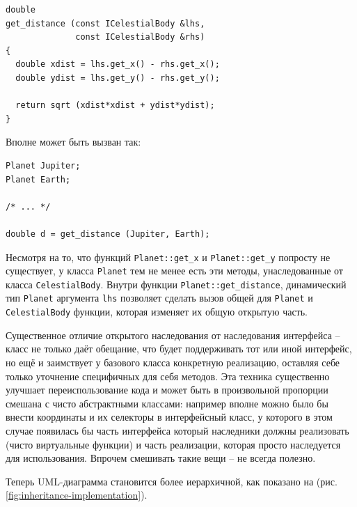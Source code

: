 \documentclass[a4paper,12pt,oneside]{article}
\begin{document}
\begin{lstlisting}
double 
get_distance (const ICelestialBody &lhs, 
              const ICelestialBody &rhs)
{
  double xdist = lhs.get_x() - rhs.get_x();
  double ydist = lhs.get_y() - rhs.get_y();

  return sqrt (xdist*xdist + ydist*ydist);
}
\end{lstlisting}

Вполне может быть вызван так:

\begin{lstlisting}
Planet Jupiter;
Planet Earth;

/* ... */

double d = get_distance (Jupiter, Earth);
\end{lstlisting}

Несмотря на то, что функций \lstinline!Planet::get_x! и \lstinline!Planet::get_y! попросту не существует, у класса \lstinline!Planet! тем не менее есть эти методы, унаследованные от класса \lstinline!CelestialBody!. Внутри функции \lstinline!Planet::get_distance!, динамический тип \lstinline!Planet! аргумента \lstinline!lhs! позволяет сделать вызов общей для \lstinline!Planet! и \lstinline!CelestialBody! функции, которая изменяет их общую открытую часть.

Существенное отличие открытого наследования от наследования интерфейса -- класс не только даёт обещание, что будет поддерживать тот или иной интерфейс, но ещё и заимствует у базового класса конкретную реализацию, оставляя себе только уточнение специфичных для себя методов. Эта техника существенно улучшает переиспользование кода и может быть в произвольной пропорции смешана с чисто абстрактными классами: например вполне можно было бы внести координаты и их селекторы в интерфейсный класс, у которого в этом случае появилась бы часть интерфейса который наследники должны реализовать (чисто виртуальные функции) и часть реализации, которая просто наследуется для использования. Впрочем смешивать такие вещи -- не всегда полезно.

Теперь UML-диаграмма становится более иерархичной, как показано на (рис. \ref{fig:inheritance-implementation}).
\end{document}
